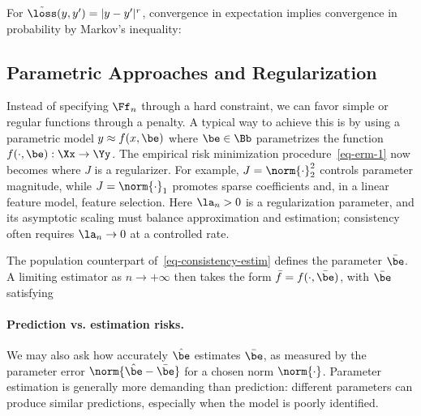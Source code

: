 For $\tilde\loss(y,y')=|y-y'|^r$, convergence in expectation implies convergence in probability by Markov's inequality:

\subsection{Parametric Approaches and Regularization}

Instead of specifying $\Ff_n$ through a hard constraint, we can favor simple or regular functions through a penalty.
%
A typical way to achieve this is by using a parametric model $y \approx f(x,\be)$ where $\be \in \Bb$ parametrizes the function $f(\cdot,\be) : \Xx \rightarrow \Yy$. The empirical risk minimization procedure~\eqref{eq-erm-1} now becomes 
where $J$ is a regularizer. For example, $J=\norm{\cdot}_2^2$ controls parameter magnitude, while $J=\norm{\cdot}_1$ promotes sparse coefficients and, in a linear feature model, feature selection. Here $\la_n>0$ is a regularization parameter, and its asymptotic scaling must balance approximation and estimation; consistency often requires $\la_n\to0$ at a controlled rate.

The population counterpart of~\eqref{eq-consistency-estim} defines the parameter $\bar \be$. A limiting estimator as $n \rightarrow +\infty$ then takes the form $\bar f = f(\cdot,\bar \be)$, with $\bar \be$ satisfying



\paragraph{Prediction vs. estimation risks.}

We may also ask how accurately $\hat\be$ estimates $\bar\be$, as measured by the parameter error $\norm{\hat\be-\bar\be}$ for a chosen norm $\norm{\cdot}$. Parameter estimation is generally more demanding than prediction: different parameters can produce similar predictions, especially when the model is poorly identified.


